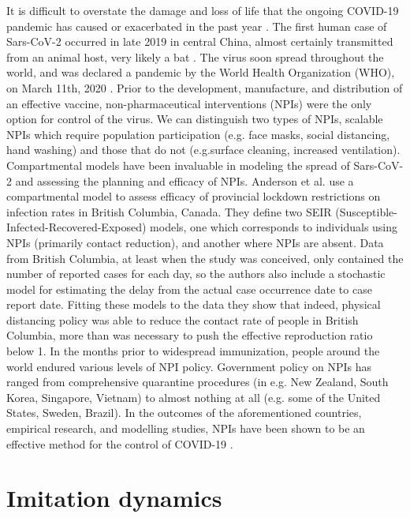 It is difficult to overstate the damage and loss of life that the ongoing COVID-19 pandemic has caused or exacerbated in the past year \cite{miller2020disease,who2021impact}. The first human case of Sars-CoV-2 occurred in late 2019 in central China, almost certainly transmitted from an animal host, very likely a bat \cite{andersen2020proximal,rasmussen2021origins,zhu2020novel}. The virus soon spread throughout the world, and was declared a pandemic by the World Health Organization (WHO), on March 11th, 2020 \cite{who2020announces}. Prior to the development, manufacture, and distribution of an effective vaccine, non-pharmaceutical interventions (NPIs) were the only option for control of the virus. We can distinguish two types of NPIs, scalable NPIs which require population participation (e.g. face masks, social distancing, hand washing) and those that do not (e.g.surface cleaning, increased ventilation). Compartmental models have been invaluable in modeling the spread of Sars-CoV-2 \cite{thompson2020epidemiological} and assessing the planning and efficacy of NPIs. Anderson et al. \cite{anderson2020estimating} use a compartmental model to assess efficacy of provincial lockdown restrictions on infection rates in British Columbia, Canada. They define two SEIR (Susceptible-Infected-Recovered-Exposed) models, one which corresponds to individuals using NPIs (primarily contact reduction), and another where NPIs are absent. Data from British Columbia, at least when the study was conceived, only contained the number of reported cases for each day, so the authors also include a stochastic model for estimating the delay from the actual case occurrence date to case report date. Fitting these models to the data they show that indeed, physical distancing policy was able to reduce the contact rate of people in British Columbia, more than was necessary to push the effective reproduction ratio below 1. In the months prior to widespread immunization, people around the world endured various levels of NPI policy. Government policy on NPIs has ranged from comprehensive quarantine procedures (in e.g. New Zealand, South Korea, Singapore, Vietnam) to almost nothing at all (e.g. some of the United States, Sweden, Brazil). In the outcomes of the aforementioned countries, empirical research, and modelling studies, NPIs have been shown to be an effective method for the control of COVID-19 \cite{flaxman2020estimating,ferguson2020report,demirguc2020sooner}. 

\section{Imitation dynamics}

